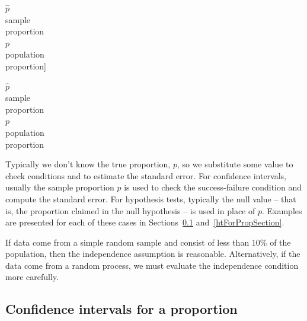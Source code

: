 $\hat{p}$\vspace{0mm}\\\footnotesize sample\\proportion\vspace{3mm}\\\normalsize$p$\vspace{0mm}\\\footnotesize population\\proportion]{\raggedright\vspace{-53mm}

$\hat{p}$\vspace{0mm}\\\footnotesize sample\\proportion\vspace{3mm}\\\normalsize$p$\vspace{0mm}\\\footnotesize population\\proportion}

Typically we don't know the true proportion, $p$, so we substitute some value to check conditions and to estimate the standard error. For confidence intervals, usually the sample proportion $\hat{p}$ is used to check the success-failure condition and compute the standard error. For hypothesis tests, typically the null value -- that is, the proportion claimed in the null hypothesis -- is used in place of $p$. Examples are presented for each of these cases in Sections~\ref{confIntForPropSection} and~\ref{htForPropSection}.

\begin{tipBox}{
If data come from a simple random sample and consist of less than 10\% of the population, then the independence assumption is reasonable. Alternatively, if the data come from a random process, we must evaluate the independence condition more carefully.}
\end{tipBox}


\textC{\newpage}


\subsection{Confidence intervals for a proportion}
\label{confIntForPropSection}


